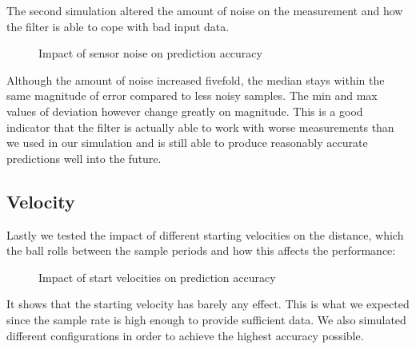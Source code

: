 \documentclass[notitlepage, a4paper, 11pt]{scrartcl}
\begin{document}
\begin{multicols}{2}
The second simulation altered the amount of noise on the measurement and how the filter is able to cope with bad input data.

\begin{figure}[H]
    \centering
    \caption{Impact of sensor noise on prediction accuracy}
    \label{fig:noise2}
\end{figure}

Although the amount of noise increased fivefold, the median stays within the same magnitude of error compared to less noisy samples. The min and max values of deviation however change greatly on magnitude.
This is a good indicator that the filter is actually able to work with worse measurements than we used in our simulation and is still able to produce reasonably accurate predictions well into the future.

\subsection{Velocity}

Lastly we tested the impact of different starting velocities on the distance, which the ball rolls between the sample periods and how this affects the performance:

\begin{figure}[H]
    \centering
    \caption{Impact of start velocities on prediction accuracy}
    \label{fig:velocity300}
\end{figure}

It shows that the starting velocity has barely any effect. 
This is what we expected since the sample rate is high enough to provide sufficient data. 
We also simulated different configurations in order to achieve the highest accuracy possible.


\end{multicols}
\end{document}
